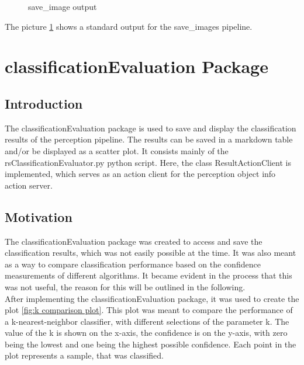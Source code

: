 \documentclass[main.tex]{subfiles}
\begin{document}
\begin{figure}[H]
{                    }
                \caption{save\_image output}
             \label{FeurichChips}
          \end{figure}
The picture \ref{FeurichChips} shows a standard output for the save\_images pipeline.

\section{classificationEvaluation Package}

\subsection{Introduction}
The classificationEvaluation package is used to save and display the classification results of the perception pipeline. The results can be saved in a markdown table and/or be displayed as a scatter plot. It consists mainly of the rsClassificationEvaluator.py python script. Here, the class ResultActionClient is implemented, which serves as an action client for the perception object info action server.\\

\subsection{Motivation}
The classificationEvaluation package was created to access and save the classification results, which was not easily possible at the time. It was also meant as a way to compare classification performance based on the confidence measurements of different algorithms. It became evident in the process that this was not useful, the reason for this will be outlined in the following.\\

After implementing the classificationEvaluation package, it was used to create the plot \ref{fig:k comparison plot}. This plot was meant to compare the performance of a k-nearest-neighbor classifier, with different selections of the parameter k. The value of the k is shown on the x-axis, the confidence is on the y-axis, with zero being the lowest and one being the highest possible confidence. Each point in the plot represents a sample, that was classified.\\
\end{document}
